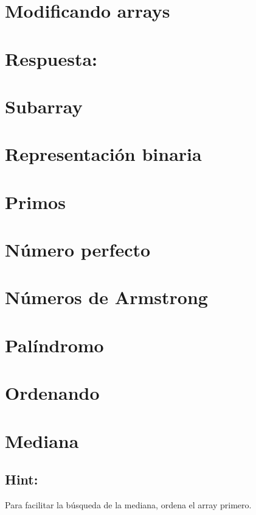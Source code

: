 \section{Modificando arrays}


\ifshowanswers
\section*{Respuesta:}

\fi

\section{Subarray}


\section{Representación binaria}


\section{Primos}


\section{Número perfecto}


\section{Números de Armstrong}


\section{Palíndromo}


\section{Ordenando}


\section{Mediana}


\ifshowanswers
\subsection*{Hint:} 
Para facilitar la búsqueda de la mediana, ordena el array primero.
\fi
